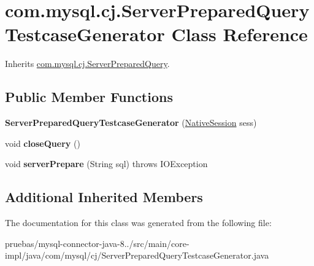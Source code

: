 \hypertarget{classcom_1_1mysql_1_1cj_1_1_server_prepared_query_testcase_generator}{}\section{com.\+mysql.\+cj.\+Server\+Prepared\+Query\+Testcase\+Generator Class Reference}
\label{classcom_1_1mysql_1_1cj_1_1_server_prepared_query_testcase_generator}


Inherits \mbox{\hyperlink{classcom_1_1mysql_1_1cj_1_1_server_prepared_query}{com.\+mysql.\+cj.\+Server\+Prepared\+Query}}.

\subsection*{Public Member Functions}
\begin{DoxyCompactItemize}
\item 
\mbox{\label{classcom_1_1mysql_1_1cj_1_1_server_prepared_query_testcase_generator_aa8abc7f158173c2aeccab1c21cc0c9d3}} 
{\bfseries Server\+Prepared\+Query\+Testcase\+Generator} (\mbox{\hyperlink{classcom_1_1mysql_1_1cj_1_1_native_session}{Native\+Session}} sess)
\item 
\mbox{\label{classcom_1_1mysql_1_1cj_1_1_server_prepared_query_testcase_generator_a10e0c29e30d505db6ede8ff438433b2e}} 
void {\bfseries close\+Query} ()
\item 
\mbox{\label{classcom_1_1mysql_1_1cj_1_1_server_prepared_query_testcase_generator_a5f5e28b35850a09946026c0d5f462500}} 
void {\bfseries server\+Prepare} (String sql)  throws I\+O\+Exception 
\end{DoxyCompactItemize}
\subsection*{Additional Inherited Members}


The documentation for this class was generated from the following file\+:\begin{DoxyCompactItemize}
\item 
pruebas/mysql-\/connector-\/java-\/8../src/main/core-\/impl/java/com/mysql/cj/Server\+Prepared\+Query\+Testcase\+Generator.\+java\end{DoxyCompactItemize}
